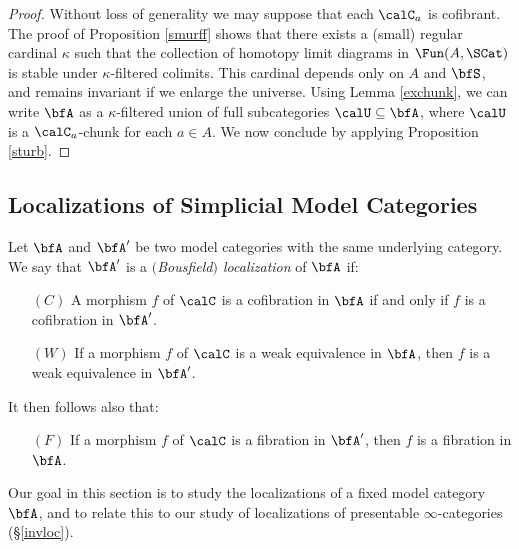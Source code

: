 \begin{Simplicial Categories}
\begin{proof}
Without loss of generality we may suppose that each $\calC_{a}$ is cofibrant.
The proof of Proposition \ref{smurff} shows that there exists a (small) regular cardinal $\kappa$
such that the collection of homotopy limit diagrams in $\Fun( A, \SCat)$ is stable under
$\kappa$-filtered colimits. This cardinal depends only on $A$ and $\bfS$, and remains invariant if we enlarge the universe. Using Lemma \ref{exchunk}, we can write
$\bfA$ as a $\kappa$-filtered union of full subcategories $\calU \subseteq \bfA$,
where $\calU$ is a $\calC_{a}$-chunk for each $a \in A$. We now conclude by
applying Proposition \ref{sturb}.
\end{proof}

\subsection{Localizations of Simplicial Model Categories}\label{turka}

Let $\bfA$ and $\bfA'$ be two model categories with the same underlying category. We say that $\bfA'$ is a {\it $($Bousfield$)$ localization} of $\bfA$ if:
\begin{itemize}
\item[$(C)$] A morphism $f$ of $\calC$ is a cofibration in $\bfA$ if and only if $f$ is a cofibration in $\bfA'$.
\item[$(W)$] If a morphism $f$ of $\calC$ is a weak equivalence in $\bfA$, then $f$ is a weak equivalence in $\bfA'$.
\end{itemize}
It then follows also that:
\begin{itemize}
\item[$(F)$] If a morphism $f$ of $\calC$ is a fibration in $\bfA'$, then $f$ is a fibration in $\bfA$.
\end{itemize}

Our goal in this section is to study the localizations of a fixed model category $\bfA$, and to relate this to our study of localizations of presentable $\infty$-categories (\S \ref{invloc}). 


\end{Simplicial Categories}
